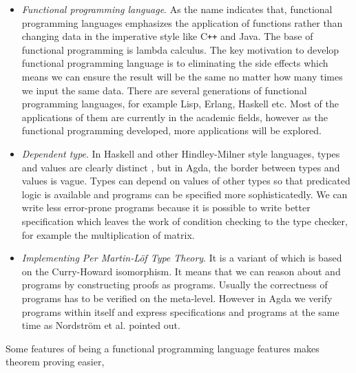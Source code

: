 \begin{itemize}

\item \textit{Functional programming language}. As the name indicates that, functional programming languages emphasizes the application of functions rather than changing data in the imperative style like C{}\verb!++! and Java. The base of functional programming is lambda calculus. The key motivation to develop functional programming language is to eliminating the side effects which means we can ensure the result will be the same no matter how many times we input the same data. There are several generations of functional programming languages, for example Lisp, Erlang, Haskell etc. Most of the applications of them are currently in the academic fields, however as the functional programming developed, more applications will be explored.

\item \textit{Dependent type}. 
In Haskell and other Hindley-Milner style languages, types and values are clearly distinct \cite{tutorial}, but in Agda, the border between types and values is vague. Types can depend on values of other types \cite{dtw} so that predicated logic is available and programs can be specified more sophisticatedly. We can write less error-prone programs because it is possible to write better specification which leaves the work of condition checking to the type checker, for example the multiplication of matrix.


\item \textit{Implementing Per Martin-Löf Type Theory}. It is a variant of \itt which is based on the Curry-Howard isomorphism\cite{aboa}. It means that we can reason about \maths and programs by constructing proofs as programs. Usually the correctness of programs has to be verified on the meta-level. However in Agda we verify programs within itself and express specifications and  programs at the same time as Nordström et al. \cite{nor:90} pointed out.
\end{itemize}




Some features of being a functional programming language features makes theorem proving easier,

